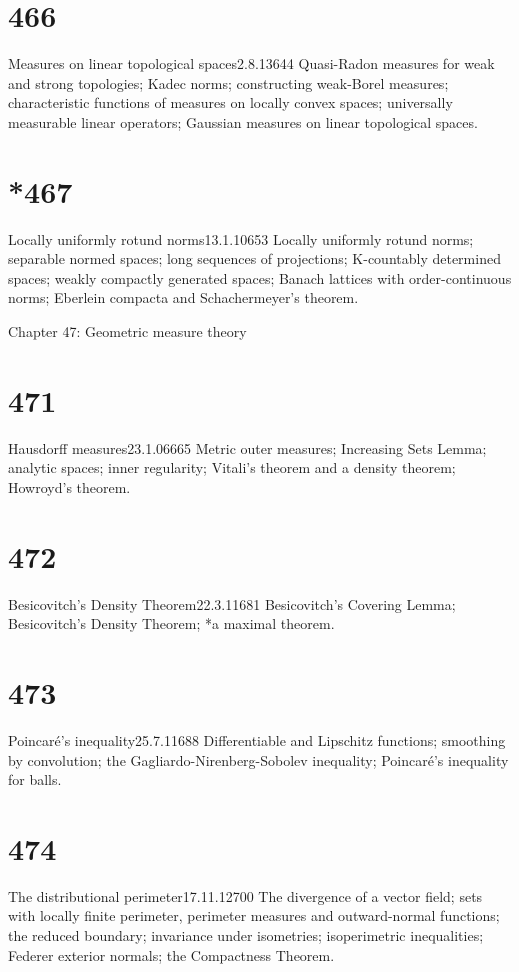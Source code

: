 \section{466}{Measures on linear topological spaces}{2.8.13}{644}{}
{Quasi-Radon measures for weak and strong topologies;  Kadec norms;
constructing weak-Borel measures;  characteristic functions of measures
on locally convex spaces;  universally measurable linear operators; 
Gaussian measures on linear topological spaces.}

\section{*467}{Locally uniformly rotund norms}{13.1.10}{653}{}
{Locally uniformly rotund norms;  separable normed spaces;  long
sequences of projections;  K-countably determined spaces;  weakly
compactly generated spaces;  Banach lattices with
order-continuous norms;  Eberlein compacta and Schachermeyer's theorem.}


  Chapter 47:  Geometric measure theory


\section{471}{Hausdorff measures}{23.1.06}{665}{}
{Metric outer measures;  Increasing Sets Lemma;  analytic spaces;  inner
regularity;  Vitali's theorem and a density theorem;  Howroyd's
theorem.}

\section{472}{Besicovitch's Density Theorem}{22.3.11}{681}{}
{Besicovitch's Covering Lemma;  Besicovitch's Density Theorem;  *a
maximal theorem.}

\section{473}{Poincar\'e's inequality}{25.7.11}{688}{}
{Differentiable and Lipschitz functions;  smoothing by convolution;  the
Gagliardo-\vthsp{}Nirenberg-\vthsp{}Sobolev inequality;
Poin\discretionary{-}{}{}car\'e's inequality for balls.}

\section{474}{The distributional perimeter}{17.11.12}{700}{}
{The divergence of a vector field;  sets with locally finite perimeter,
perimeter measures and outward-normal functions;  the reduced boundary;
invariance under isometries;  isoperimetric inequalities;  Federer
exterior normals;  the Compactness Theorem.}

